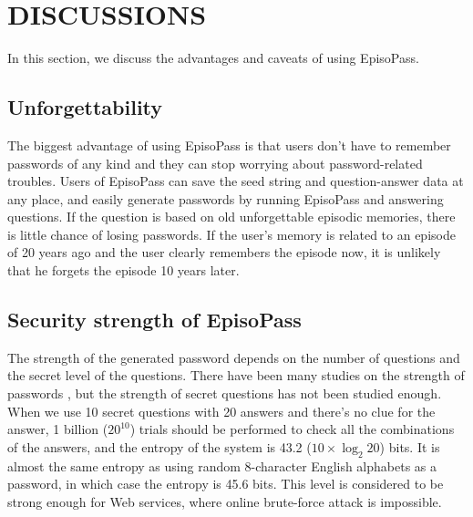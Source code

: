 \documentclass{sigchi}
\begin{document}
\section{DISCUSSIONS}

In this section, we discuss the advantages and caveats of
using EpisoPass.

\subsection{Unforgettability}

The biggest advantage of using EpisoPass is that
users don't have to remember passwords of any kind and
they can stop worrying about password-related troubles.
%
Users of EpisoPass can save the seed string and question-answer data
at any place, and easily generate passwords by running
EpisoPass and answering questions.
If the question is based on old unforgettable episodic memories,
there is little chance of losing passwords.
If the user's memory is related to an episode of 20 years ago and the user clearly
remembers the episode now, it is unlikely that he forgets the episode 10 years later.

\subsection{Security strength of EpisoPass}

The strength of the generated password depends on the number of
questions and the secret level of the questions.
%
There have been many studies on the strength of passwords
\cite{Hayashi:2011:DSP:1978942.1979326}%
\cite{Komanduri:2011:PPM:1978942.1979321}, %
but the strength of secret questions has not been studied enough.
%
%
When we use 10 secret questions with 20 answers and
there's no clue for the answer,
1 billion ($20^10$) trials should be performed to check
all the combinations of the answers,
and the entropy of the system is 43.2 ($10 \times \log_2 20$) bits.  %
%
%
It is almost the same entropy as using random 8-character English alphabets
as a password, in which case the entropy is 45.6 bits.
This level is considered to be strong enough for Web services,
where online brute-force attack is impossible\cite{Florencio:2007:SWP:1361419.1361429}.
\end{document}
